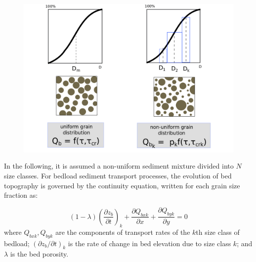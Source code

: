 \begin{figure}[H]%
\begin{center}
\includegraphics[scale=0.3]{./graphics/graded.png}
\end{center}
\end{figure}

\noindent
In the following, it is assumed a non-uniform sediment mixture divided into $N$ size classes. For bedload sediment transport processes, the evolution of bed topography is governed by the continuity equation, written for each grain size fraction as:

\begin{equation}
(1-\lambda)\left(\frac{\partial z_b}{\partial t}\right)_k+\frac{\partial Q_{bxk}}{\partial x}+\frac{\partial Q_{byk}}{\partial y} = 0
\end{equation}
 where $Q_{bxk}, Q_{byk}$ are the components of transport rates of the $k$th size class of bedload; $(\partial z_b/\partial t)_k$ is the rate of change in bed elevation due to size class $k$; and $\lambda$ is the bed porosity.

